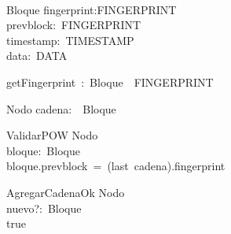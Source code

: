 \begin{zed}
\\
\end{zed}
\begin{schema}{Bloque}
fingerprint:FINGERPRINT\\
prevblock:~FINGERPRINT\\
timestamp:~TIMESTAMP\\
data:~DATA\\
\end{schema}
\begin{axdef}
getFingerprint~:~Bloque~\fun~FINGERPRINT\\
\end{axdef}
\begin{schema}{Nodo}
cadena:~\seq~Bloque\\
\end{schema}
\begin{schema}{ValidarPOW}
\Xi Nodo\\
bloque:~Bloque\\
\where
bloque.prevblock~=~(last~cadena).fingerprint\\
\end{schema}
\begin{schema}{AgregarCadenaOk}
\Delta Nodo\\
nuevo?:~Bloque\\
\where
true\\
\end{schema}
